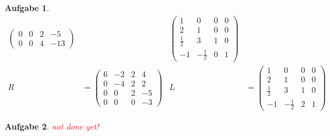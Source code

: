 \documentclass[11pt]{article}
\theoremstyle{break}
\newtheorem{task}{Aufgabe}
\def\ndy{
    \textcolor{red} {\hfill not done yet!}
    \reversemarginpar
    \marginpar{\raggedleft\textcolor{red}{\rule{2mm}{2mm}}}
}
\begin{document}
\begin{task}
\begin{align*}
\begin{pmatrix}
            0 & 0 & 2 & -5 \\
            0 & 0 & 4 & -13
        \end{pmatrix} && 
        \begin{pmatrix}
            1 & 0 & 0 & 0 \\
            2 & 1 & 0 & 0 \\
            \frac{1}{2} & 3 & 1 & 0 \\
            -1 & -\frac{1}{2} & 0 & 1 
        \end{pmatrix}\\
        R &= \begin{pmatrix}
            6 & -2 & 2 & 4 \\
            0 & -4 & 2 & 2 \\
            0 & 0 & 2 & -5 \\
            0 & 0 & 0 & -3
        \end{pmatrix} & L &= 
        \begin{pmatrix}
            1 & 0 & 0 & 0 \\
            2 & 1 & 0 & 0 \\
            \frac{1}{2} & 3 & 1 & 0 \\
            -1 & -\frac{1}{2} & 2 & 1 
        \end{pmatrix}
    \end{align*}
\end{task}

\begin{task}
    \ndy
\end{task}
\end{document}
